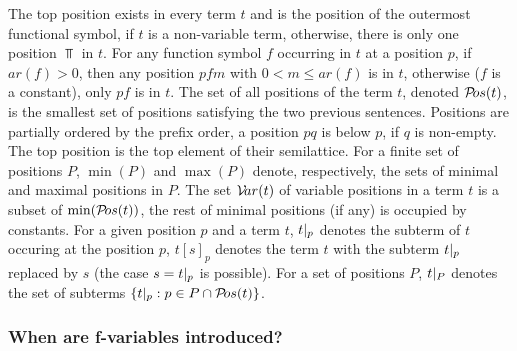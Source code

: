The top position exists in every term $t$ and is the position of the outermost
functional symbol, if $t$ is a non-variable term, otherwise, there is only
one position $\Top$ in $t$.  For any function symbol $f$ occurring in $t$ at
a position $p$, if \(ar(f)>0\), then any position \(pfm\) with \(0<m\leq
ar(f)\) is in $t$, otherwise ($f$ is a constant), only \(pf\) is in $t$.  The
set of all positions of the term $t$, denoted \({\sl{\cal P}\!os}(t)\), is the smallest set
of positions satisfying the two previous sentences.  Positions are partially
ordered by the prefix order, a position $pq$ is below $p$, if $q$ is
non-empty.  The top position is the top element of their semilattice.  For a
finite set of positions $P$, \(\min(P)\) and \(\max(P)\) denote,
respectively, the sets of minimal and maximal positions in $P$.  The set 
\({\sl{\cal V}\!ar}(t)\) of variable positions in a term $t$ is a subset of \(\min ({\sl{\cal P}\!os}(t))\), the rest of minimal positions (if any) is occupied by constants.
For a given
position $p$ and a term $t$, \(t|_{p}\) denotes the subterm of $t$
occuring at the position $p$, $t[s]_p$ denotes the term $t$ with the subterm
\(t|_{p}\) replaced by $s$ (the case \(s=t|_{p}\) is 
possible).  For a set of positions $P$, \(t|_{P}\) denotes the set of
subterms \(\{t|_{p}:p\in P\cap {\sl{\cal P}\!os}(t)\}\).

\subsubsection{When are f-variables introduced?}

